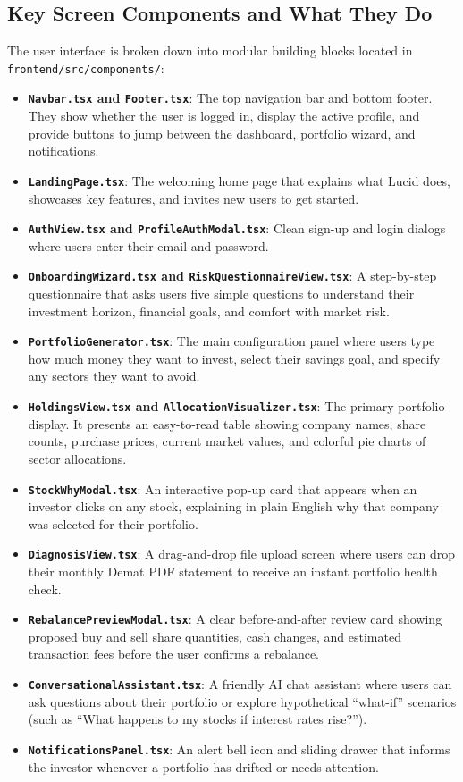 \subsection{Key Screen Components and What They Do}
The user interface is broken down into modular building blocks located in \texttt{frontend/src/components/}:
\begin{itemize}
    \item \textbf{\texttt{Navbar.tsx} and \texttt{Footer.tsx}}: The top navigation bar and bottom footer. They show whether the user is logged in, display the active profile, and provide buttons to jump between the dashboard, portfolio wizard, and notifications.
    \item \textbf{\texttt{LandingPage.tsx}}: The welcoming home page that explains what Lucid does, showcases key features, and invites new users to get started.
    \item \textbf{\texttt{AuthView.tsx} and \texttt{ProfileAuthModal.tsx}}: Clean sign-up and login dialogs where users enter their email and password.
    \item \textbf{\texttt{OnboardingWizard.tsx} and \texttt{RiskQuestionnaireView.tsx}}: A step-by-step questionnaire that asks users five simple questions to understand their investment horizon, financial goals, and comfort with market risk.
    \item \textbf{\texttt{PortfolioGenerator.tsx}}: The main configuration panel where users type how much money they want to invest, select their savings goal, and specify any sectors they want to avoid.
    \item \textbf{\texttt{HoldingsView.tsx} and \texttt{AllocationVisualizer.tsx}}: The primary portfolio display. It presents an easy-to-read table showing company names, share counts, purchase prices, current market values, and colorful pie charts of sector allocations.
    \item \textbf{\texttt{StockWhyModal.tsx}}: An interactive pop-up card that appears when an investor clicks on any stock, explaining in plain English why that company was selected for their portfolio.
    \item \textbf{\texttt{DiagnosisView.tsx}}: A drag-and-drop file upload screen where users can drop their monthly Demat PDF statement to receive an instant portfolio health check.
    \item \textbf{\texttt{RebalancePreviewModal.tsx}}: A clear before-and-after review card showing proposed buy and sell share quantities, cash changes, and estimated transaction fees before the user confirms a rebalance.
    \item \textbf{\texttt{ConversationalAssistant.tsx}}: A friendly AI chat assistant where users can ask questions about their portfolio or explore hypothetical ``what-if'' scenarios (such as ``What happens to my stocks if interest rates rise?'').
    \item \textbf{\texttt{NotificationsPanel.tsx}}: An alert bell icon and sliding drawer that informs the investor whenever a portfolio has drifted or needs attention.
\end{itemize}

